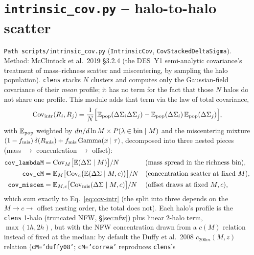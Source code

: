 \documentclass[a4paper, 11pt]{article}
\newcommand{\modname}[1]{\textcolor{kwcol}{\texttt{#1}}}
\newcommand{\pyfile}[1]{{\small\texttt{#1}}}
\begin{document}
\section{\pyfile{intrinsic\_cov.py} -- halo-to-halo scatter}
\label{sec:intrinsic}

\modname{Path}\ \pyfile{scripts/intrinsic\_cov.py}
(\texttt{IntrinsicCov}, \texttt{CovStackedDeltaSigma}). Method:
McClintock et al.\ 2019 \S3.2.4 (the DES~Y1 semi-analytic covariance's
treatment of mass--richness scatter and miscentering, by sampling the
halo population). \modname{clens} stacks $N$ clusters and computes
only the Gaussian-field covariance of their \emph{mean} profile; it
has no term for the fact that those $N$ halos do not share one
profile. This module adds that term via the law of total covariance,
\begin{equation}
\label{eq:cov-intr}
  \mathrm{Cov}_{\rm intr}(R_i,R_j) = \frac{1}{N}\Big[
    \mathbb{E}_{\rm pop}(\Delta\Sigma_i\Delta\Sigma_j)
    - \mathbb{E}_{\rm pop}(\Delta\Sigma_i)\,\mathbb{E}_{\rm pop}(\Delta\Sigma_j)
  \Big],
\end{equation}
with $\mathbb{E}_{\rm pop}$ weighted by $dn/d\ln M\times P(\lambda\in
{\rm bin}\mid M)$ and the miscentering mixture $(1-f_{\rm
mis})\,\delta(R_{\rm mis}) + f_{\rm mis}\,\mathrm{Gamma}(x\mid\tau)$,
decomposed into three nested pieces (mass $\to$ concentration $\to$
offset):
\begin{align}
  \texttt{cov\_lambdaM}  &= \mathrm{Cov}_M\big[\mathbb{E}(\Delta\Sigma\mid M)\big]/N
    &&\text{(mass spread in the richness bin)}, \\
  \texttt{cov\_cM}       &= \mathbb{E}_M\big[\mathrm{Cov}_c\big(\mathbb{E}(\Delta\Sigma\mid M,c)\big)\big]/N
    &&\text{(concentration scatter at fixed $M$)}, \\
  \texttt{cov\_miscen}   &= \mathbb{E}_{M,c}\big[\mathrm{Cov}_{\rm mis}(\Delta\Sigma\mid M,c)\big]/N
    \label{eq:miscen-cov-term}
    &&\text{(offset draws at fixed $M,c$),}
\end{align}
which sum exactly to Eq.~\eqref{eq:cov-intr} (the split into three
depends on the $M\to c\to$ offset nesting order, the total does not).
Each halo's profile is the \modname{clens} 1-halo (truncated NFW,
\S\ref{sec:nfw}) plus linear 2-halo term, $\max(1h,2h)$, but with the
NFW concentration drawn from a $c(M)$ relation instead of fixed at
the median: by default the Duffy et al.\ 2008 $c_{200m}(M,z)$ relation
(\texttt{cM='duffy08'}; \texttt{cM='correa'} reproduces \modname{clens}'s
\end{document}
